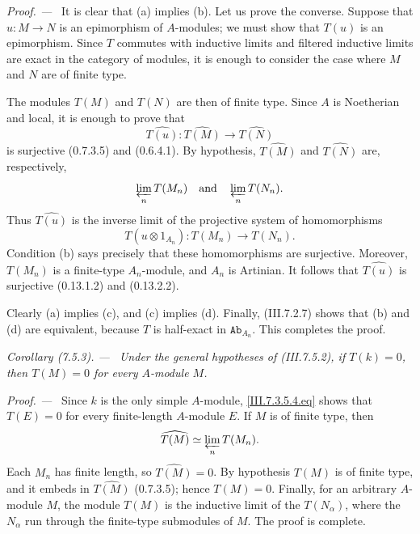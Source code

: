 \documentclass[10pt,oneside]{book}
\newcommand{\cat}[1]{\mathtt{#1}}
\newcommand{\sref}[2][]{(#2)}
\newcommand{\oldpage}[2][]{\setcounter{footnote}{0}\marginpar{\scriptsize\textbf{#1}~|~#2}\ignorespaces}
\newenvironment{corollary}[1][]{\par\medskip\noindent\itshape Corollary (#1). ---\ }{\par}
\newenvironment{proof}{\par\medskip\noindent\textit{Proof. ---\ }}{\par}
\begin{document}
\begin{proof}
It is clear that (a) implies (b).  Let us prove the converse.
Suppose that $u:M\to N$ is an epimorphism of $A$-modules; we
must show that $T(u)$ is an epimorphism.  Since $T$ commutes
with inductive limits and filtered inductive limits are exact
in the category of modules, it is enough to consider the case
where $M$ and $N$ are of finite type.

The modules $T(M)$ and $T(N)$ are then of finite type.  Since
$A$ is Noetherian and local, it is enough to prove that
\[
  \widehat{T(u)}:
  \widehat{T(M)}
  \longrightarrow
  \widehat{T(N)}
\]
is surjective \sref[0]{0.7.3.5} and \sref[0]{0.6.4.1}.
By hypothesis, $\widehat{T(M)}$ and $\widehat{T(N)}$ are,
respectively,
\[
  \varprojlim_n T(M_n)
  \quad\hbox{and}\quad
  \varprojlim_n T(N_n).
\]
Thus $\widehat{T(u)}$ is the inverse limit of the projective
system of homomorphisms
\[
  T(u\otimes 1_{A_n}):T(M_n)\longrightarrow T(N_n).
\]
Condition (b) says precisely that these homomorphisms are
surjective.  Moreover, $T(M_n)$ is a finite-type
$A_n$-module, and $A_n$ is Artinian.  It follows that
$\widehat{T(u)}$ is surjective \sref[0]{0.13.1.2} and
\sref[0]{0.13.2.2}.

Clearly (a) implies (c), and (c) implies (d).  Finally,
\sref{III.7.2.7} shows that (b) and (d) are equivalent,
because $T$ is half-exact in $\cat{Ab}_{A_n}$.  This completes
the proof.
\end{proof}

\begin{corollary}[7.5.3]
\label{III.7.5.3}
Under the general hypotheses of \sref{III.7.5.2}, if
$T(k)=0$, then $T(M)=0$ for every $A$-module $M$.
\end{corollary}

\begin{proof}
\oldpage[III]{191}
Since $k$ is the only simple $A$-module,
\eqref{III.7.3.5.4.eq} shows that $T(E)=0$ for every
finite-length $A$-module $E$.  If $M$ is of finite type, then
\[
  \widehat{T(M)}
  \simeq
  \varprojlim_n T(M_n).
\]
Each $M_n$ has finite length, so $\widehat{T(M)}=0$.  By
hypothesis $T(M)$ is of finite type, and it embeds in
$\widehat{T(M)}$ \sref[0]{0.7.3.5}; hence $T(M)=0$.
Finally, for an arbitrary $A$-module $M$, the module $T(M)$
is the inductive limit of the $T(N_\alpha)$, where the
$N_\alpha$ run through the finite-type submodules of $M$.
The proof is complete.
\end{proof}
\end{document}
